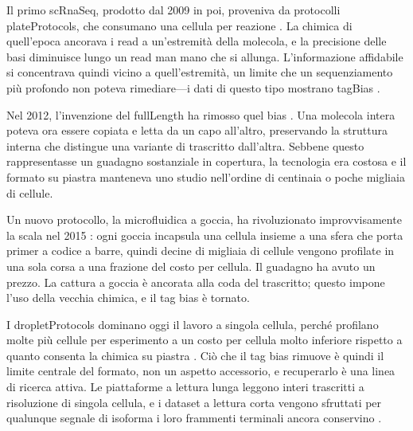 Il primo \gls{scRnaSeq}, prodotto dal 2009 in poi, proveniva da protocolli \gls{plateProtocols}, che consumano una cellula per reazione \cite{tang2009mrna}. La chimica di quell'epoca ancorava i read a un'estremità della molecola, e la precisione delle basi diminuisce lungo un read man mano che si allunga. L'informazione affidabile si concentrava quindi vicino a quell'estremità, un limite che un sequenziamento più profondo non poteva rimediare---i dati di questo tipo mostrano \gls{tagBias} \cite{hashimshony2012cel}.

Nel 2012, l'invenzione del \gls{fullLength} ha rimosso quel bias \cite{ramskold2012full, picelli2013smart}. Una molecola intera poteva ora essere copiata e letta da un capo all'altro, preservando la struttura interna che distingue una variante di trascritto dall'altra. Sebbene questo rappresentasse un guadagno sostanziale in copertura, la tecnologia era costosa e il formato su piastra manteneva uno studio nell'ordine di centinaia o poche migliaia di cellule.

Un nuovo protocollo, la microfluidica a goccia, ha rivoluzionato improvvisamente la scala nel 2015 \cite{zheng2017massively}: ogni goccia incapsula una cellula insieme a una sfera che porta primer a codice a barre, quindi decine di migliaia di cellule vengono profilate in una sola corsa a una frazione del costo per cellula. Il guadagno ha avuto un prezzo. La cattura a goccia è ancorata alla coda del trascritto; questo impone l'uso della vecchia chimica, e il tag bias è tornato.

I \gls{dropletProtocols} dominano oggi il lavoro a singola cellula, perché profilano molte più cellule per esperimento a un costo per cellula molto inferiore rispetto a quanto consenta la chimica su piastra \cite{conte2024opportunities}. Ciò che il tag bias rimuove è quindi il limite centrale del formato, non un aspetto accessorio, e recuperarlo è una linea di ricerca attiva. Le piattaforme a lettura lunga leggono interi trascritti a risoluzione di singola cellula, e i dataset a lettura corta vengono sfruttati per qualunque segnale di isoforma i loro frammenti terminali ancora conservino \cite{joglekar2023words}.

